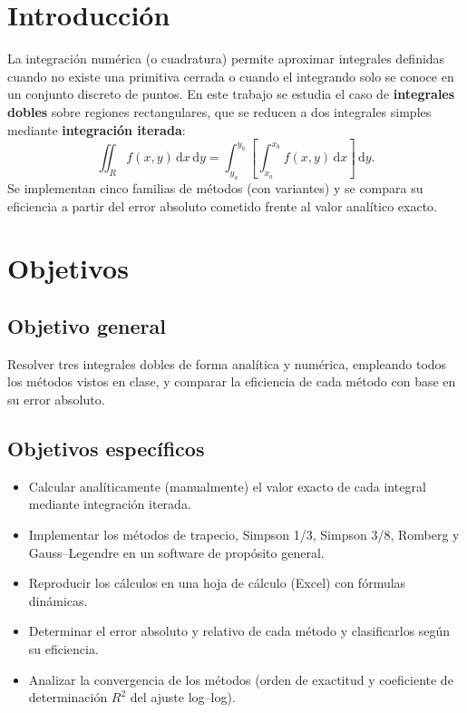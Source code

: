 \documentclass[12pt,a4paper]{article}
\newcommand{\dd}{\,\mathrm{d}}
\begin{document}
\section{Introducción}
La integración numérica (o cuadratura) permite aproximar integrales definidas
cuando no existe una primitiva cerrada o cuando el integrando solo se conoce
en un conjunto discreto de puntos. En este trabajo se estudia el caso de
\textbf{integrales dobles} sobre regiones rectangulares, que se reducen a dos
integrales simples mediante \textbf{integración iterada}:
\[
  \iint_R f(x,y)\dd x\dd y
  = \int_{y_a}^{y_b}\!\left[\int_{x_a}^{x_b} f(x,y)\dd x\right]\dd y .
\]
Se implementan cinco familias de métodos (con variantes) y se compara su
eficiencia a partir del error absoluto cometido frente al valor analítico
exacto.
\section{Objetivos}

\subsection{Objetivo general}
Resolver tres integrales dobles de forma analítica y numérica, empleando todos
los métodos vistos en clase, y comparar la eficiencia de cada método con base
en su error absoluto.

\subsection{Objetivos específicos}
\begin{itemize}[leftmargin=1.4em]
  \item Calcular analíticamente (manualmente) el valor exacto de cada integral
        mediante integración iterada.
  \item Implementar los métodos de trapecio, Simpson 1/3, Simpson 3/8,
        Romberg y Gauss--Legendre en un software de propósito general.
  \item Reproducir los cálculos en una hoja de cálculo (Excel) con fórmulas
        dinámicas.
  \item Determinar el error absoluto y relativo de cada método y clasificarlos
        según su eficiencia.
  \item Analizar la convergencia de los métodos (orden de exactitud y
        coeficiente de determinación $R^2$ del ajuste log--log).
\end{itemize}
\end{document}
